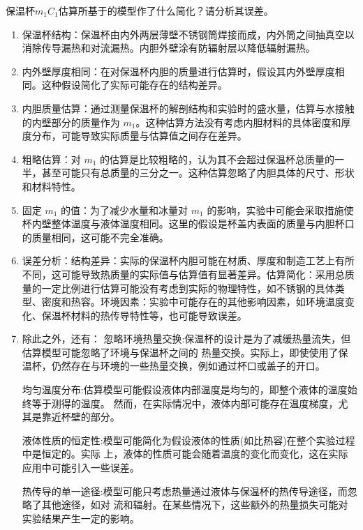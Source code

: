\documentclass[dvipsnames, svgnames,a4paper,11pt]{article}
\begin{document}
	\begin{question}
		保温杯$m_1C_1$估算所基于的模型作了什么简化？请分析其误差。
	\end{question}
	\begin{enumerate}
		\item 保温杯结构：保温杯由内外两层薄壁不锈钢筒焊接而成，内外筒之间抽真空以消除传导漏热和对流漏热。内胆外壁涂有防辐射层以降低辐射漏热。
		
		\item 内外壁厚度相同：在对保温杯内胆的质量进行估算时，假设其内外壁厚度相同。这种假设简化了实际可能存在的结构差异。
		
		\item 内胆质量估算：通过测量保温杯的解剖结构和实验时的盛水量，估算与水接触的内壁部分的质量作为 \( m_1 \)。这种估算方法没有考虑内胆材料的具体密度和厚度分布，可能导致实际质量与估算值之间存在差异。
		
		\item 粗略估算：对 \( m_1 \) 的估算是比较粗略的，认为其不会超过保温杯总质量的一半，甚至可能只有总质量的三分之一。这种估算忽略了内胆具体的尺寸、形状和材料特性。
		
		\item 固定 \( m_1 \) 的值：为了减少水量和冰量对 \( m_1 \) 的影响，实验中可能会采取措施使杯内壁整体温度与液体温度相同。这里的假设是杯盖内表面的质量与内胆杯口的质量相同，这可能不完全准确。
		
		\item 误差分析：结构差异：实际的保温杯内胆可能在材质、厚度和制造工艺上有所不同，这可能导致热质量的实际值与估算值有显著差异。估算简化：采用总质量的一定比例进行估算可能没有考虑到实际的物理特性，如不锈钢的具体类型、密度和热容。环境因素：实验中可能存在的其他影响因素，如环境温度变化、保温杯材料的热传导特性等，也可能导致误差。
		
		\item 除此之外，还有：
		忽略环境热量交换:保温杯的设计是为了减缓热量流失，但估算模型可能忽略了环境与保温杯之间的 热量交换。实际上，即使使用了保温杯，仍然存在与环境的一些热量交换，例如通过杯口或盖子的开口。
		
		均匀温度分布:估算模型可能假设液体内部温度是均匀的，即整个液体的温度始终等于测得的温度。 然而，在实际情况中，液体内部可能存在温度梯度，尤其是靠近杯壁的部分。
		
		液体性质的恒定性:模型可能简化为假设液体的性质(如比热容)在整个实验过程中是恒定的。实际 上，液体的性质可能会随着温度的变化而变化，这在实际应用中可能引入一些误差。
		
		热传导的单一途径:模型可能只考虑热量通过液体与保温杯的热传导途径，而忽略了其他途径，如对 流和辐射。在某些情况下，这些额外的热量损失可能对实验结果产生一定的影响。
	\end{enumerate}
		
\end{document}
